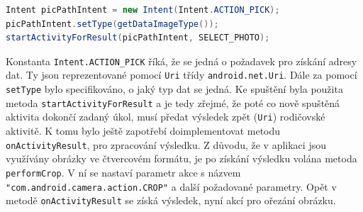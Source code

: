 \documentclass[12pt]{article}
\begin{document}
\begin{itemize}
\begin{lstlisting}[language=Java,
title=Následujícím kódem použitý v aplikaci se vyvolá nabídka pro výběr snímku z galerie.,
basicstyle=\ttfamily\small\color{black},
commentstyle=\itshape,
keywordstyle=\color{Blue},
showstringspaces=false,
frame=lines,
backgroundcolor=\color{lightGrey}
]
Intent picPathIntent = new Intent(Intent.ACTION_PICK);
picPathIntent.setType(getDataImageType());
startActivityForResult(picPathIntent, SELECT_PHOTO);
\end{lstlisting}
Konstanta \verb+Intent.ACTION_PICK+ říká, že se jedná o požadavek pro získání adresy dat. Ty jsou reprezentované pomocí \verb+Uri+ třídy \verb+android.net.Uri+. Dále za pomocí \verb+setType+ bylo specifikováno, o jaký typ dat se jedná. Ke spuštění byla použita metoda \verb+startActivityForResult+ a je tedy zřejmé, že poté co nově spuštěná aktivita dokončí zadaný úkol, musí předat výsledek zpět (\verb+Uri+) rodičovské aktivitě. K tomu bylo ještě zapotřebí doimplementovat metodu \verb+onActivityResult+, pro zpracování výsledku. Z důvodu, že v aplikaci jsou využívány obrázky ve čtvercovém formátu, je po získání výsledku volána metoda \verb+performCrop+. V ní se nastaví parametr akce s názvem \verb+"com.android.camera.action.CROP"+ a další požadované parametry. Opět v metodě \verb+onActivityResult+ se získá výsledek, nyní akcí pro ořezání obrázku.

\end{itemize}
\end{document}
